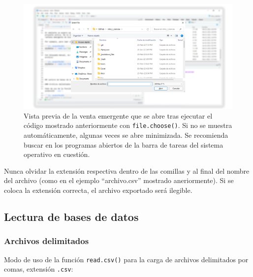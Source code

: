 \documentclass[
]{article}
\theoremstyle{definition}
\theoremstyle{definition}
\theoremstyle{definition}
\theoremstyle{definition}
\theoremstyle{remark}
\begin{document}
\begin{figure}

{\centering \includegraphics[width=1\linewidth]{figs/screenshots/ventana emergente file choose} 

}

\caption{Vista previa de la venta emergente que se abre tras ejecutar el código mostrado anteriormente con \texttt{file.choose()}. Si no se muestra automáticamente, algunas veces se abre minimizada. Se recomienda buscar en los programas abiertos de la barra de tareas del sistema operativo en cuestión.}\label{fig:figura47}
\end{figure}

\begin{rmdwarning}
Nunca olvidar la extensión respectiva dentro de las comillas y al final del nombre del archivo (como en el ejemplo ``archivo.csv'' mostrado aneriormente). Si se coloca la extensión correcta, el archivo exportado será ilegible.
\end{rmdwarning}

\hypertarget{lectura-de-bases-de-datos}{%
\subsection{Lectura de bases de datos}\label{lectura-de-bases-de-datos}}

\hypertarget{archivos-delimitados}{%
\subsubsection{Archivos delimitados}\label{archivos-delimitados}}

Modo de uso de la función \texttt{read.csv()} para la carga de archivos delimitados por comas, extensión \texttt{.csv}:
\end{document}
